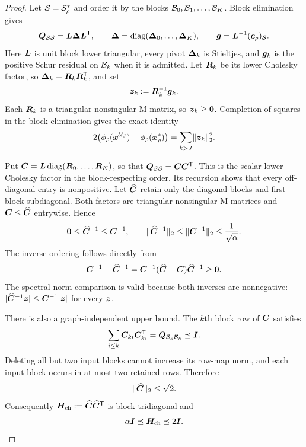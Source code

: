 \begin{proof}
Let $\mathcal{S}=\mathcal{S}_\rho^*$ and order it by the blocks
$\mathcal{B}_0,\mathcal{B}_1,\ldots,\mathcal{B}_K$.  Block elimination gives
\begin{equation*}
 \bm{Q}_{\mathcal{S}\mathcal{S}}=\bm{L}\bm{\Delta}\bm{L}^{\mathsf{T}},
 \qquad
 \bm{\Delta}=\operatorname{diag}(\bm{\Delta}_0,\ldots,\bm{\Delta}_K),
 \qquad
 \bm{g}=\bm{L}^{-1}(\bm{c}_\rho)_{\mathcal{S}}.
\end{equation*}
Here $\bm{L}$ is unit block lower triangular, every pivot $\bm{\Delta}_k$ is
Stieltjes, and $\bm{g}_k$ is the positive Schur residual on $\mathcal{B}_k$ when it is
admitted. Let $\bm{R}_k$ be its lower Cholesky factor, so
$\bm{\Delta}_k=\bm{R}_k\bm{R}_k^{\mathsf{T}}$, and set
\begin{equation*}
 \bm{z}_k:=\bm{R}_k^{-1}\bm{g}_k.
\end{equation*}
Each $\bm{R}_k$ is a triangular nonsingular M-matrix, so $\bm{z}_k\geq\bm{0}$.
Completion of squares in the block elimination gives the exact identity
\begin{equation}
 2\bigl(\phi_\rho(\bm{x}^{\mathcal{U}_J})-\phi_\rho(\bm{x}_\rho^*)\bigr)
 =\sum_{k>J}\lVert\bm{z}_k\rVert_2^2.
 \label{eq:batch-exact-gap-tail}
\end{equation}

Put
$\bm{C}=\bm{L}\operatorname{diag}(\bm{R}_0,\ldots,\bm{R}_K)$, so that
$\bm{Q}_{\mathcal{S}\mathcal{S}}=\bm{C}\bm{C}^{\mathsf{T}}$.  This is the scalar lower Cholesky factor in the
block-respecting order.  Its recursion shows that every off-diagonal entry is
nonpositive.  Let $\widehat{\bm{C}}$ retain only the diagonal blocks and first
block subdiagonal.  Both factors are triangular nonsingular M-matrices and
$\bm{C}\leq\widehat{\bm{C}}$ entrywise.  Hence
\begin{equation}
 \bm{0}\leq\widehat{\bm{C}}^{-1}\leq\bm{C}^{-1},
 \qquad
 \lVert\widehat{\bm{C}}^{-1}\rVert_2
 \leq\lVert\bm{C}^{-1}\rVert_2\leq\frac1{\sqrt\alpha}.
 \label{eq:batch-bidiagonal-inverse}
\end{equation}
The inverse ordering follows directly from
\[
 \bm{C}^{-1}-\widehat{\bm{C}}^{-1}
 =\bm{C}^{-1}(\widehat{\bm{C}}-\bm{C})\widehat{\bm{C}}^{-1}\geq\bm{0}.
\]
The spectral-norm comparison is valid because both inverses are nonnegative:
$|\widehat{\bm{C}}^{-1}\bm{z}|\leq\bm{C}^{-1}|\bm{z}|$ for every $\bm{z}$.

There is also a graph-independent upper bound.  The $k$th block row of
$\bm{C}$ satisfies
\begin{equation*}
 \sum_{i\leq k}\bm{C}_{ki}\bm{C}_{ki}^{\mathsf{T}}
 =\bm{Q}_{\mathcal{B}_k\mathcal{B}_k}\preceq\bm{I}.
\end{equation*}
Deleting all but two input blocks cannot increase its row-map norm, and each
input block occurs in at most two retained rows.  Therefore
\begin{equation*}
 \lVert\widehat{\bm{C}}\rVert_2\leq\sqrt2.
\end{equation*}
Consequently
$\bm{H}_{\mathrm{ch}}:=\widehat{\bm{C}}\widehat{\bm{C}}^{\mathsf{T}}$ is block tridiagonal and
\begin{equation*}
 \alpha\bm{I}\preceq\bm{H}_{\mathrm{ch}}\preceq2\bm{I}.
\end{equation*}


\end{proof}
